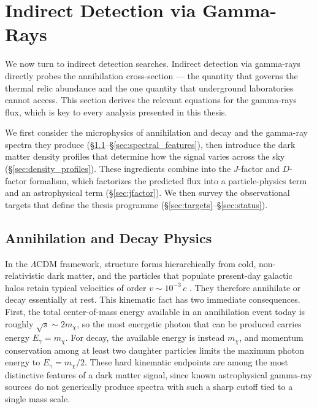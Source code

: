 
\section{Indirect Detection via Gamma-Rays}
\label{sec:1.4}

We now turn to indirect detection searches.
Indirect detection via gamma-rays directly probes the annihilation cross-section --- the quantity that governs the thermal relic abundance and the one quantity that underground laboratories cannot access.
This section derives the relevant equations for the gamma-rays flux, which is key to every analysis presented in this thesis.

We first consider the microphysics of annihilation and decay and the gamma-ray spectra they produce (\S\ref{sec:ann_decay}--\S\ref{sec:spectral_features}), then introduce the dark matter density profiles that determine how the signal varies across the sky (\S\ref{sec:density_profiles}).
These ingredients combine into the $J$-factor and $D$-factor formalism, which factorizes the predicted flux into a particle-physics term and an astrophysical term (\S\ref{sec:jfactor}). We then survey the observational targets that define the thesis programme (\S\ref{sec:targets}--\S\ref{sec:status}).

\subsection{Annihilation and Decay Physics}
\label{sec:ann_decay}

In the $\Lambda$CDM framework, structure forms hierarchically from cold, non-relativistic dark matter, and the particles that populate present-day galactic halos retain typical velocities of order $v \sim 10^{-3}\, c$ \cite{Hooper:2024}.
They therefore annihilate or decay essentially at rest.
This kinematic fact has two immediate consequences.
First, the total center-of-mass energy available in an annihilation event today is roughly $\sqrt{s} \sim 2 m_\chi$, so the most energetic photon that can be produced carries energy $E_\gamma = m_\chi$.
For decay, the available energy is instead $m_\chi$, and momentum conservation among at least two daughter particles limits the maximum photon energy to $E_\gamma = m_\chi / 2$.
These hard kinematic endpoints are among the most distinctive features of a dark matter signal, since known astrophysical gamma-ray sources do not generically produce spectra with such a sharp cutoff tied to a single mass scale.

